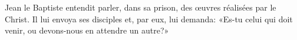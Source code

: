 \encetemps Jean le Baptiste entendit parler, dans sa prison, 
	des œuvres réalisées par le Christ. 
Il lui envoya ses disciples et, par eux, lui demanda:
	«Es-tu celui qui doit venir, ou devons-nous en attendre un autre?»
